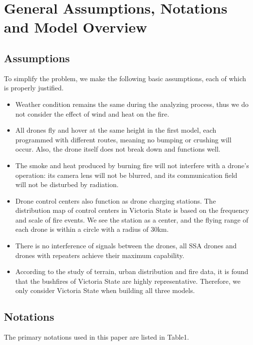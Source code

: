 \documentclass{mcmthesis}
\begin{document}
\section{General Assumptions, Notations and Model Overview}
\subsection{Assumptions}
To simplify the problem, we make the following basic assumptions, each of which is properly justified.
\begin{itemize}
	\item Weather condition remains the same during the analyzing process, thus we do not consider the effect of wind and heat on the fire.
	
	\item All drones fly and hover at the same height in the first model, each programmed with different routes, meaning no bumping or crushing will occur. Also, the drone itself does not break down and functions well.
	
	\item The smoke and heat produced by burning fire will not interfere with a drone’s operation: its camera lens will not be blurred, and its communication field will not be disturbed by radiation. 
	
	\item Drone control centers also function as drone charging stations. The distribution map of control centers in Victoria State is based on the frequency and scale of fire events. We see the station as a center, and the flying range of each drone is within a circle with a radius of 30km.
	
	\item There is no interference of signals between the drones, all SSA drones and drones with repeaters achieve their maximum capability. 
	
	\item According to the study of terrain, urban distribution and fire data, it is found that the bushfires of Victoria State are highly representative. Therefore, we only consider Victoria State when building all three models. 
\end{itemize}

\subsection{Notations}
The primary notations used in this paper are listed in  Table1.
\end{document}
